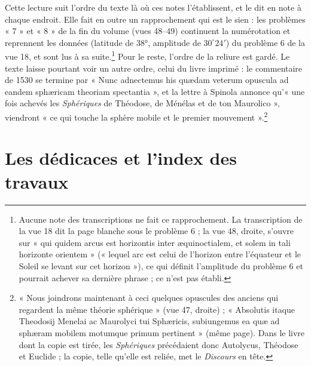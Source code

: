 \documentclass[11pt,a4paper]{article}
\begin{document}
Cette lecture suit l'ordre du texte là où ces notes l'établissent, et le dit
en note à chaque endroit. Elle fait en outre un rapprochement qui est le sien :
les problèmes « 7 » et « 8 » de la fin du volume (vues 48--49) continuent la
numérotation et reprennent les données (latitude de 38°, amplitude de
$30^\circ 24'$) du problème 6 de la vue 18, et sont lus à sa suite.\footnote{Aucune
note des transcriptions ne fait ce rapprochement. La transcription de la vue 18
dit la page blanche sous le problème 6 ; la vue 48, droite, s'ouvre sur « qui
quidem arcus est horizontis inter æquinoctialem, et solem in tali horizonte
orientem » (« lequel arc est celui de l'horizon entre l'équateur et le Soleil
se levant sur cet horizon »), ce qui définit l'amplitude du problème 6 et
pourrait achever sa dernière phrase ; ce n'est pas établi.} Pour le reste,
l'ordre de la reliure est gardé. Le texte laisse pourtant voir un autre ordre,
celui du livre imprimé : le commentaire de 1530 se termine par « Nunc
adnectemus his quædam veterum opuscula ad eandem sphæricam theoriam
spectantia », et la lettre à Spinola annonce qu'« une fois achevés les
\emph{Sphériques} de Théodose, de Ménélas et de ton Maurolico », viendront
« ce qui touche la sphère mobile et le premier mouvement ».\footnote{« Nous
joindrons maintenant à ceci quelques opuscules des anciens qui regardent la
même théorie sphérique » (vue 47, droite) ; « Absolutis itaque Theodosij
Menelai ac Maurolyci tui Sphæricis, subiungemus ea quæ ad sphæram mobilem
motumque primum pertinent » (même page). Dans le livre dont la copie est
tirée, les \emph{Sphériques} précédaient donc Autolycus, Théodose et Euclide ;
la copie, telle qu'elle est reliée, met le \emph{Discours} en tête.}

\section*{Les dédicaces et l'index des travaux}
\end{document}
